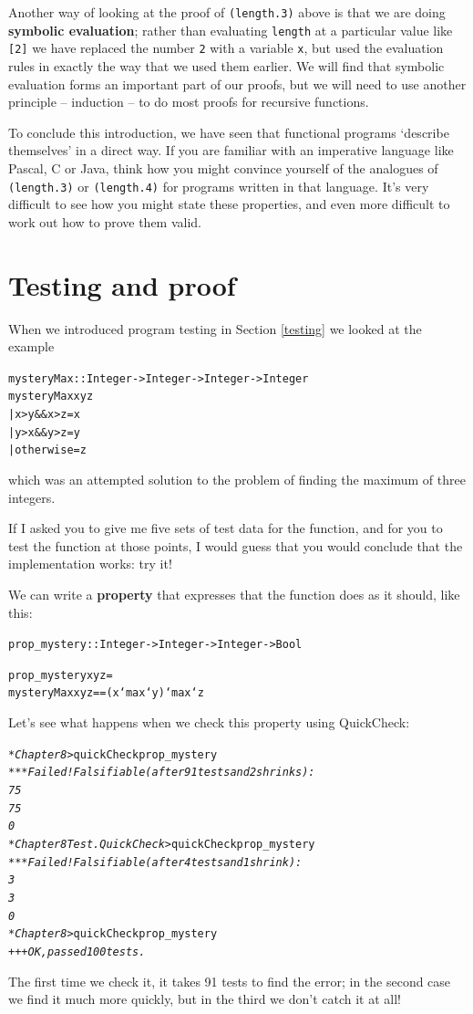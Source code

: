 Another way of looking at the proof of \texttt{(length.3)} above is that
we are doing \textbf{symbolic evaluation}; rather than evaluating
\texttt{length} at a particular value like \texttt{[2]} we have replaced
the number \texttt{2}
with a variable \texttt{x}, but used the evaluation rules in exactly
the way that we used them earlier. We will find that symbolic
evaluation forms an important part of our proofs, but we will need to
use another principle -- induction -- to do most proofs for recursive
functions.

To conclude this introduction, we have seen that functional programs
`describe themselves' in a direct way. If you are familiar with an
imperative language like Pascal, C or Java, think how you might convince
yourself of the analogues of \texttt{(length.3)}
or \texttt{(length.4)} for programs written in that language. 
It's very difficult to see how you might state
these properties, and even more difficult to work out how to prove them valid.

\section{Testing and proof}

When we introduced program testing in Section \ref{testing} we looked at the example
\begin{alltt}
mysteryMax :: Integer -> Integer -> Integer -> Integer
mysteryMax x y z
  | x > y \&\& x > z      = x
  | y > x \&\& y > z      = y
  | otherwise           = z
\end{alltt} 
which was an attempted solution to the problem of finding the maximum of three integers.


If I asked you to give me five sets of test data for the function, and for you to test the function at those points, I would guess that you would conclude that the implementation works: try it!

We can write a \textbf{property} that expresses that the function does as it should, like this:
\begin{alltt}
prop_mystery :: Integer -> Integer -> Integer -> Bool

prop_mystery x y z =
    mysteryMax x y z == (x `max` y) `max` z
\end{alltt} 
Let's see what happens when we check this property using QuickCheck:
\begin{alltt}
\textsl{*Chapter8>} quickCheck prop_mystery
\textsl{*** Failed! Falsifiable (after 91 tests and 2 shrinks):     
75
75
0
*Chapter8 Test.QuickCheck>} quickCheck prop_mystery
\textsl{*** Failed! Falsifiable (after 4 tests and 1 shrink):     
3
3
0
*Chapter8>} quickCheck prop_mystery
\textsl{+++ OK, passed 100 tests.}
\end{alltt}
The first time we check it, it takes 91 tests to find the error; in the second case we find it much more quickly, but in the third we don't catch it at all!

